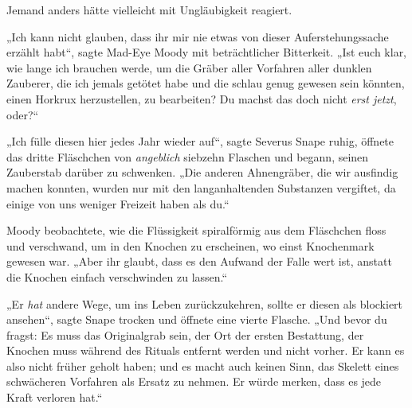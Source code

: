 Jemand anders hätte vielleicht mit Ungläubigkeit reagiert.

„Ich kann nicht glauben, dass ihr mir nie etwas von dieser Auferstehungssache erzählt habt“, sagte Mad-Eye Moody mit beträchtlicher Bitterkeit.
„Ist euch klar, wie lange ich brauchen werde, um die Gräber aller Vorfahren aller dunklen Zauberer, die ich jemals getötet habe und die schlau genug gewesen sein könnten, einen Horkrux herzustellen, zu bearbeiten? Du machst das doch nicht \emph{erst jetzt}, oder?“

„Ich fülle diesen hier jedes Jahr wieder auf“, sagte Severus Snape ruhig, öffnete das dritte Fläschchen von \emph{angeblich} siebzehn Flaschen und begann, seinen Zauberstab darüber zu schwenken.
„Die anderen Ahnengräber, die wir ausfindig machen konnten, wurden nur mit den langanhaltenden Substanzen vergiftet, da einige von uns weniger Freizeit haben als du.“

Moody beobachtete, wie die Flüssigkeit spiralförmig aus dem Fläschchen floss und verschwand, um in den Knochen zu erscheinen, wo einst Knochenmark gewesen war.
„Aber ihr glaubt, dass es den Aufwand der Falle wert ist, anstatt die Knochen einfach verschwinden zu lassen.“

„Er \emph{hat} andere Wege, um ins Leben zurückzukehren, sollte er diesen als blockiert ansehen“, sagte Snape trocken und öffnete eine vierte Flasche.
„Und bevor du fragst: Es muss das Originalgrab sein, der Ort der ersten Bestattung, der Knochen muss während des Rituals entfernt werden und nicht vorher. Er kann es also nicht früher geholt haben; und es macht auch keinen Sinn, das Skelett eines schwächeren Vorfahren als Ersatz zu nehmen. Er würde merken, dass es jede Kraft verloren hat.“

